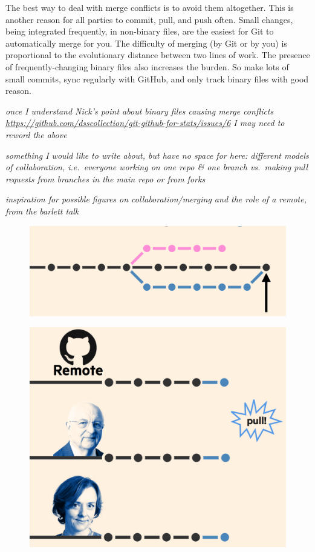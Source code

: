 \documentclass[12pt]{article}
\begin{document}
The best way to deal with merge conflicts is to avoid them altogether.
This is another reason for all parties to commit, pull, and push often.
Small changes, being integrated frequently, in non-binary files, are the
easiest for Git to automatically merge for you. The difficulty of
merging (by Git or by you) is proportional to the evolutionary distance
between two lines of work. The presence of frequently-changing binary
files also increases the burden. So make lots of small commits, sync
regularly with GitHub, and only track binary files with good reason.

\emph{once I understand Nick's point about binary files causing merge
conflicts
\url{https://github.com/dsscollection/git-github-for-stats/issues/6} I
may need to reword the above}

\emph{something I would like to write about, but have no space for here:
different models of collaboration, i.e.~everyone working on one repo \&
one branch vs.~making pull requests from branches in the main repo or
from forks}

\emph{inspiration for possible figures on collaboration/merging and the
role of a remote, from the barlett talk}

\begin{figure}
\centering
\includegraphics{bartlett-merge-commit.png}
\caption{}
\end{figure}

\begin{figure}
\centering
\includegraphics{bartlett-pull.png}
\caption{}
\end{figure}
\end{document}

